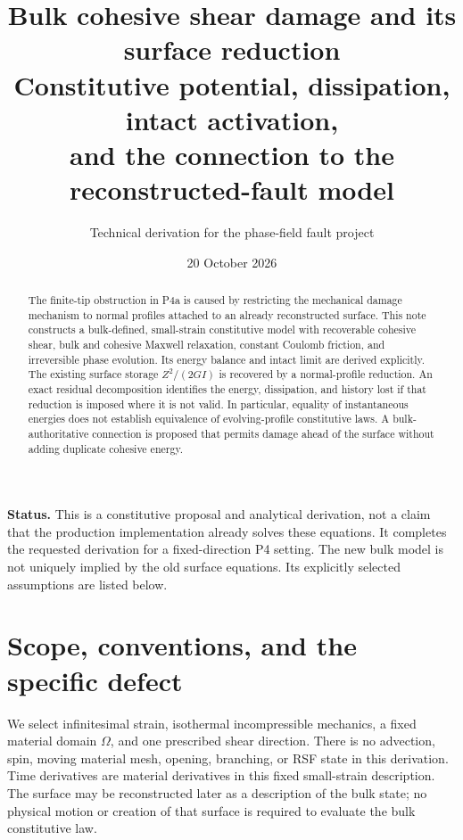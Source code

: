 \documentclass[11pt,a4paper]{article}
\title{\textbf{Bulk cohesive shear damage and its surface reduction}\\[5pt]
\large Constitutive potential, dissipation, intact activation,\\
and the connection to the reconstructed-fault model}
\author{Technical derivation for the phase-field fault project}
\date{20 October 2026}
\numberwithin{equation}{section}
\begin{document}
\maketitle
\begin{abstract}
The finite-tip obstruction in P4a is caused by restricting the mechanical
damage mechanism to normal profiles attached to an already reconstructed
surface. This note constructs a bulk-defined, small-strain constitutive model
with recoverable cohesive shear, bulk and cohesive Maxwell relaxation,
constant Coulomb friction, and irreversible phase evolution. Its energy
balance and intact limit are derived explicitly. The existing surface storage
$Z^2/(2GI)$ is recovered by a normal-profile reduction. An exact residual
decomposition identifies the energy, dissipation, and history lost if that
reduction is imposed where it is not valid. In particular, equality of
instantaneous energies does not establish equivalence of evolving-profile
constitutive laws. A bulk-authoritative connection is proposed that permits
damage ahead of the surface without adding duplicate cohesive energy.
\end{abstract}

\textbf{Status.} This is a constitutive proposal and analytical derivation,
not a claim that the production implementation already solves these equations.
It completes the requested derivation for a fixed-direction P4 setting.
The new bulk model is not uniquely implied by the old surface equations.
Its explicitly selected assumptions are listed below.

\tableofcontents
\newpage

\section{Scope, conventions, and the specific defect}

We select infinitesimal strain, isothermal incompressible mechanics, a fixed
material domain $\Omega$, and one prescribed shear direction. There is no
advection, spin, moving material mesh, opening, branching, or RSF state in
this derivation. Time derivatives are material derivatives in this fixed
small-strain description. The surface may be reconstructed later as a
description of the bulk state; no physical motion or creation of that surface
is required to evaluate the bulk constitutive law.
\end{document}
